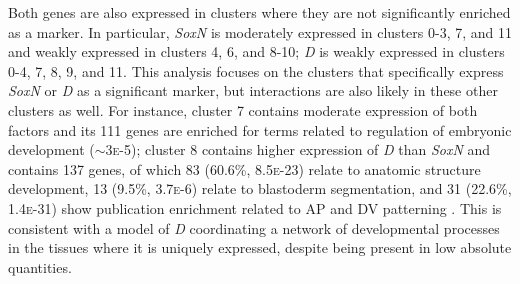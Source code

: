 \documentclass[withindex,glossary]{cam-thesis}
\begin{document}
Both genes are also expressed in clusters where they are not
significantly enriched as a marker. In particular, \emph{SoxN} is
moderately expressed in clusters 0-3, 7, and 11 and weakly expressed in
clusters 4, 6, and 8-10; \emph{D} is weakly expressed in clusters 0-4,
7, 8, 9, and 11. This analysis focuses on the clusters that specifically
express \emph{SoxN} or \emph{D} as a significant marker, but
interactions are also likely in these other clusters as well. For
instance, cluster 7 contains moderate expression of both factors and its
111 genes are enriched for terms related to regulation of embryonic
development ($\sim{}$3\textsc{e}-5); cluster 8 contains higher
expression of \emph{D} than \emph{SoxN} and contains 137 genes, of which
83 (60.6\%, 8.5\textsc{e}-23) relate to anatomic structure development, 13
(9.5\%, 3.7\textsc{e}-6) relate to blastoderm segmentation, and 31 (22.6\%,
1.4\textsc{e}-31) show publication enrichment related to AP and DV patterning
. This is consistent with a model of \emph{D}
coordinating a network of developmental processes in the tissues where
it is uniquely expressed, despite being present in low absolute
quantities.
\end{document}
